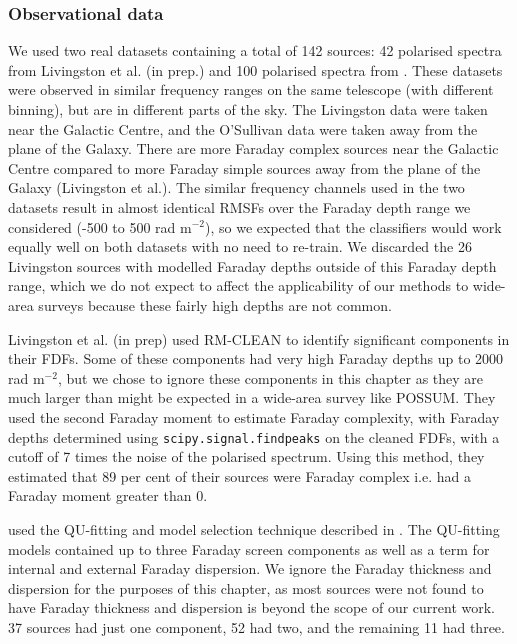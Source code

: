   \subsubsection{Observational data}
  \label{sec:faraday-observational-data}

    We used two real datasets containing a total of 142 sources: 42 polarised spectra from Livingston et al. (in prep.) and 100 polarised spectra from \citet{osullivan_broad-band_2017}. These datasets were observed in similar frequency ranges on the same telescope (with different binning), but are in different parts of the sky. The Livingston data were taken near the Galactic Centre, and the O'Sullivan data were taken away from the plane of the Galaxy. There are more Faraday complex sources near the Galactic Centre compared to more Faraday simple sources away from the plane of the Galaxy (Livingston et al.). The similar frequency channels used in the two datasets result in almost identical RMSFs over the Faraday depth range we considered (-500 to 500 rad m$^{-2}$), so we expected that the classifiers would work equally well on both datasets with no need to re-train. We discarded the 26 Livingston sources with modelled Faraday depths outside of this Faraday depth range, which we do not expect to affect the applicability of our methods to wide-area surveys because these fairly high depths are not common.

    Livingston et al. (in prep) used RM-CLEAN \citep{heald09faraday} to identify significant components in their FDFs. Some of these components had very high Faraday depths up to 2000 rad m$^{-2}$, but we chose to ignore these components in this chapter as they are much larger than might be expected in a wide-area survey like POSSUM. They used the second Faraday moment \citep{Brown11report} to estimate Faraday complexity, with Faraday depths determined using \texttt{scipy.signal.find\textunderscore{}peaks} on the cleaned FDFs, with a cutoff of 7 times the noise of the polarised spectrum. Using this method, they estimated that 89 per cent of their sources were Faraday complex i.e. had a Faraday moment greater than 0.

    \citet{osullivan_broad-band_2017} used the QU-fitting and model selection technique described in \citet{osullivan12agn}. The QU-fitting models contained up to three Faraday screen components as well as a term for internal and external Faraday dispersion. We ignore the Faraday thickness and dispersion for the purposes of this chapter, as most sources were not found to have Faraday thickness and dispersion is beyond the scope of our current work. 37 sources had just one component, 52 had two, and the remaining 11 had three.

